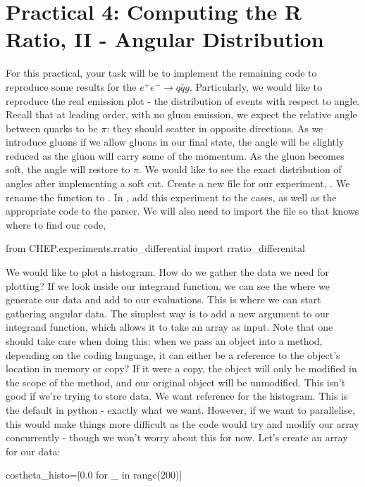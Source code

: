 \section*{Practical 4: Computing the R Ratio, II - Angular Distribution }

For this practical, your task will be to implement the remaining code to reproduce some results for the $e^+e^-\to q\bar{q}g$. Particularly, we would like to reproduce the real emission plot - the distribution of events with respect to angle. Recall that at leading order, with no gluon emission, we expect the relative angle between quarks to be $\pi$: they should scatter in opposite directions. As we introduce gluons if we allow gluons in our final state, the angle will be slightly reduced as the gluon will carry some of the momentum. As the gluon becomes soft, the angle will restore to $\pi$. We would like to see the exact distribution of angles after implementing a soft cut. 
Create a new file for our experiment, . We rename the function to . In , add this experiment to the cases, as well as the appropriate code to the parser. We will also need to import the file so that  knows where to find our code,
\begin{codeenv}
    from CHEP.experiments.rratio_differential import rratio_differenital
\end{codeenv}
We would like to plot a histogram. How do we gather the data we need for plotting? If we look inside our integrand function, we can see the where we generate our data and add to our evaluations. This is where we can start gathering angular data. The simplest way is to add a new argument to our integrand function, which allows it to take an array as input. Note that one should take care when doing this: when we pass an object into a method, depending on the coding language, it can either be a reference to the object's location in memory or copy? If it were a copy, the object will only be modified in the scope of the method, and our original object will be unmodified. This isn't good if we're trying to store data. We want reference for the histogram. This is the default in python - exactly what we want. However, if we want to parallelise, this would make things more difficult as the code would try and modify our array concurrently - though we won't worry about this for now. Let's create an array for our data:
\begin{codeenv}
       costheta_histo=[0.0 for _ in range(200)]
\end{codeenv}
